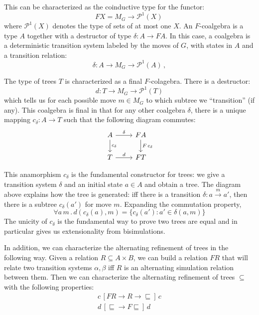 \documentclass{article}
\begin{document}
This can be characterized as the coinductive type for the functor:
\[ F X = M_G \rightarrow \mathcal{P}^1(X)\, \]
where $\mathcal{P}^1(X)$ denotes the type of sets of at most one $X$.
An $F$-coalgebra is a type $A$
together with a destructor of type $\delta : A \rightarrow F A$.
In this case, a coalgebra is a deterministic transition system
labeled by the moves of $G$,
with states in $A$ and a transition relation:
\[ \delta : A \rightarrow M_G \rightarrow \mathcal{P}^1(A) \, , \]

The type of trees $T$ is characterized as a final $F$-colagebra.
There is a destructor:
\[ d : T \rightarrow M_G \rightarrow \mathcal{P}^1(T) \]
which tells us for each possible move $m \in M_G$
to which subtree we ``transition'' (if any).
This coalgebra is final in that for any other coalgebra $\delta$,
there is a unique mapping $c_{\delta} : A \rightarrow T$
such that the following diagram commutes:
\[
  \begin{tikzcd}
    A \arrow[r, "\delta"]
      \arrow[d, "c_{\delta}"] &
    F A \arrow[d, "F \, c_\delta"] \\
    T \arrow[r, "d"] &
    F T
  \end{tikzcd}
\]

This anamorphism $c_\delta$ is
the fundamental constructor for trees:
we give a transition system $\delta$ and an initial state $a \in A$
and obtain a tree.
The diagram above explains how the tree is generated:
iff there is a transition $\delta : a \stackrel{m}{\longrightarrow} a'$,
then there is a subtree $c_{\delta}(a')$ for move $m$.
Expanding the commutation property,
\[
  \forall a \, m \,.\,
    d(c_{\delta}(a), m) = \{ c_{\delta}(a') : a' \in \delta(a, m) \}
\]
The unicity of $c_\delta$ is
the fundamental way to prove two trees are equal
and in particular gives us extensionality from bisimulations.

In addition,
we can characterize the alternating refinement of trees
in the following way.
Given a relation $R \subseteq A \times B$,
we can build a relation $F R$ that will relate
two transition systems $\alpha, \beta$ iff
$R$ is an alternating simulation relation between them.
Then we can characterize the alternating refinement of trees $\subseteq$
with the following properties:
\begin{gather*}
  c \, [F R \rightarrow R \rightarrow {\sqsubseteq}] \, c \\
  d \, [{\sqsubseteq} \rightarrow F {\sqsubseteq}] \, d
\end{gather*}
\end{document}
